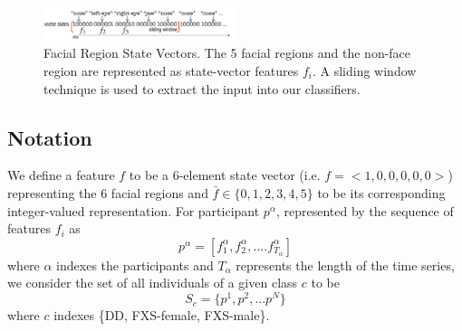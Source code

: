 \documentclass[10pt,twocolumn,letterpaper]{article}
\begin{document}

\begin{figure}[b]
        \centering
             \includegraphics[width=0.5\textwidth]{figures/vectors.png}
       \caption{Facial Region State Vectors. The 5 facial regions and the non-face region are represented as state-vector features $f_i$. A sliding window technique is used to extract the input into our classifiers.}
        \label{fig:statevectors}
\end{figure}

\subsection{Notation} 
\label{sec:notation}
We define a feature $f$ to be a 6-element state vector (i.e. $f=<1,0,0,0,0,0>$) representing the 6 facial regions and $\bar{f} \in \{0,1,2,3,4,5\}$ to be its corresponding integer-valued representation. For participant $p^\alpha$, represented by the sequence of features $f_i$ as
\begin{equation}
p^\alpha=[f_1^\alpha, f_2^\alpha,....f_{T_\alpha}^\alpha]
\end{equation}
where $\alpha$ indexes the participants and $T_\alpha$ represents the length of the time series, we consider the set of all individuals of a given class $c$ to be
\begin{equation}
S_c=\{p^1, p^2,...p^N \}
\end{equation}
 where $c$ indexes \{DD, FXS-female, FXS-male\}.
\end{document}
